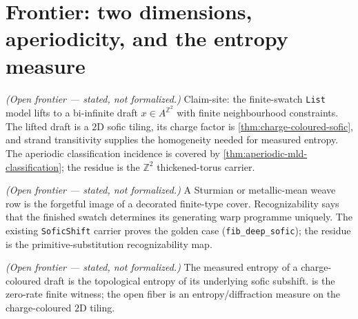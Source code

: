 \section{Frontier: two dimensions, aperiodicity, and the entropy measure}

\begin{theorem}\label{thm:weave-2d-sofic}\notready{}
\emph{(Open frontier --- stated, not formalized.)} Claim-site: the finite-swatch
\texttt{List} model lifts to a bi-infinite draft $x\in A^{\mathbb{Z}^2}$ with finite
neighbourhood constraints.  The lifted draft is a $2$D sofic tiling, its charge
factor is \cref{thm:charge-coloured-sofic}, and strand transitivity supplies the
homogeneity needed for measured entropy.  The aperiodic classification incidence is
covered by \cref{thm:aperiodic-mld-classification}; the residue is the
$\mathbb{Z}^2$ thickened-torus carrier.
\end{theorem}

\begin{theorem}\label{thm:quasiperiodic-weave-recognizable}\notready{}
\emph{(Open frontier --- stated, not formalized.)} A Sturmian or metallic-mean weave
row is the forgetful image of a decorated finite-type cover.  Recognizability says
that the finished swatch determines its generating warp programme uniquely.  The
existing \texttt{SoficShift} carrier proves the golden case
(\texttt{fib\_deep\_sofic}); the residue is the primitive-substitution
recognizability map.
\end{theorem}

\begin{theorem}\label{thm:weave-tiles-entropy}\notready{}
\emph{(Open frontier --- stated, not formalized.)} The measured entropy of a
charge-coloured draft is the topological entropy of its underlying sofic subshift.
 is the zero-rate finite witness; the open fiber is
an entropy/diffraction measure on the charge-coloured $2$D tiling.
\end{theorem}
